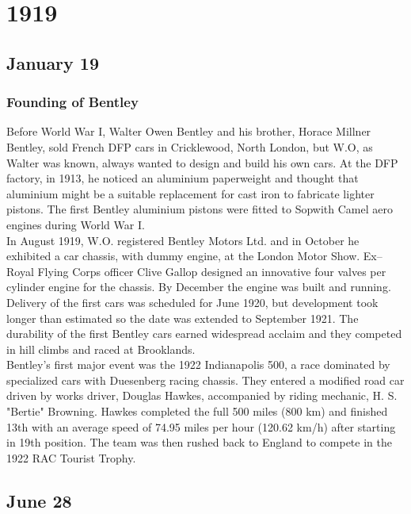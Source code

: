 \documentclass[11pt]{report}
\begin{document}
\chapter{1919}
\section{January 19}
\subsection{Founding of Bentley}
Before World War I, Walter Owen Bentley and his brother, Horace Millner Bentley, sold French DFP cars in Cricklewood, North London, but W.O, as Walter was known, always wanted to design and build his own cars. At the DFP factory, in 1913, he noticed an aluminium paperweight and thought that aluminium might be a suitable replacement for cast iron to fabricate lighter pistons. The first Bentley aluminium pistons were fitted to Sopwith Camel aero engines during World War I.\\
In August 1919, W.O. registered Bentley Motors Ltd. and in October he exhibited a car chassis, with dummy engine, at the London Motor Show. Ex–Royal Flying Corps officer Clive Gallop designed an innovative four valves per cylinder engine for the chassis. By December the engine was built and running. Delivery of the first cars was scheduled for June 1920, but development took longer than estimated so the date was extended to September 1921. The durability of the first Bentley cars earned widespread acclaim and they competed in hill climbs and raced at Brooklands.\\
Bentley's first major event was the 1922 Indianapolis 500, a race dominated by specialized cars with Duesenberg racing chassis. They entered a modified road car driven by works driver, Douglas Hawkes, accompanied by riding mechanic, H. S. "Bertie" Browning. Hawkes completed the full 500 miles (800 km) and finished 13th with an average speed of 74.95 miles per hour (120.62 km/h) after starting in 19th position. The team was then rushed back to England to compete in the 1922 RAC Tourist Trophy.
\section{June 28}
\end{document}
